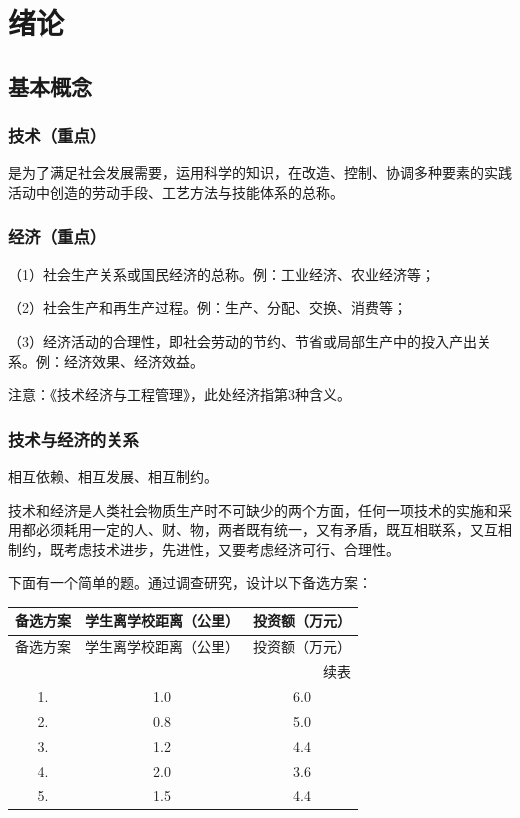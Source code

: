 \chapter{绪论}
\section{基本概念}
\subsection{技术（重点）}
是为了满足社会发展需要，运用科学的知识，在改造、控制、协调多种要素的实践活动中创造的劳动手段、工艺方法与技能体系的总称。

\subsection{经济（重点）}
（1）社会生产关系或国民经济的总称。例：工业经济、农业经济等；

（2）社会生产和再生产过程。例：生产、分配、交换、消费等；

（3）经济活动的合理性，即社会劳动的节约、节省或局部生产中的投入产出关系。例：经济效果、经济效益。

注意：《技术经济与工程管理》，此处经济指第3种含义。

\subsection{技术与经济的关系}
相互依赖、相互发展、相互制约。

技术和经济是人类社会物质生产时不可缺少的两个方面，任何一项技术的实施和采用都必须耗用一定的人、财、物，两者既有统一，又有矛盾，既互相联系，又互相制约，既考虑技术进步，先进性，又要考虑经济可行、合理性。

下面有一个简单的题。通过调查研究，设计以下备选方案：
\begin{longtable}{ccc}
\toprule
备选方案 & 学生离学校距离（公里） & 投资额（万元） \\
\midrule
\endfirsthead
\toprule
备选方案 & 学生离学校距离（公里） & 投资额（万元） \\
\midrule
\endhead
\midrule
\multicolumn{3}{r}{{续表}}\\
\endfoot
\bottomrule
\endlastfoot

1. & 1.0 & 6.0 \\
2. & 0.8 & 5.0 \\
3. & 1.2 & 4.4 \\
4. & 2.0 & 3.6 \\
5. & 1.5 & 4.4 \\
\end{longtable}


